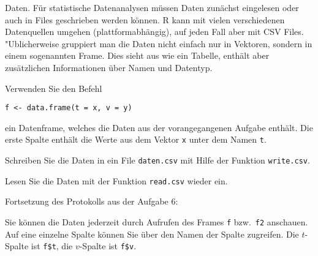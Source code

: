 Daten. Für statistische Datenanalysen müssen Daten zunächst eingelesen
oder auch in Files geschrieben werden können.
R kann mit vielen verschiedenen Datenquellen umgehen
(plattformabhängig), auf jeden Fall aber mit CSV Files.
"Ublicherweise gruppiert man die Daten nicht einfach nur in Vektoren, sondern
in einem sogenannten Frame. Dies sieht aus wie ein Tabelle, enthält aber
zusätzlichen Informationen über Namen und Datentyp.
\begin{teilaufgaben}
\item Verwenden Sie den Befehl
\begin{verbatim}
f <- data.frame(t = x, v = y)
\end{verbatim}
ein Datenframe, welches die Daten aus der vorangegangenen
Aufgabe enthält. Die erste Spalte enthält die Werte aus dem Vektor
{\tt x} unter dem Namen {\tt t}.
\item Schreiben Sie die Daten in ein File {\tt daten.csv} mit Hilfe der
Funktion {\tt write.csv}.
\item Lesen Sie die Daten mit der Funktion {\tt read.csv} wieder ein.
\end{teilaufgaben}

\begin{loesung}
Fortsetzung des Protokolls aus der Aufgabe 6:

Sie können die Daten jederzeit durch Aufrufen des Frames {\tt f}
bzw.~{\tt f2} anschauen. Auf eine einzelne Spalte können Sie über
den Namen der Spalte zugreifen. Die $t$-Spalte ist {\tt f\$t},
die $v$-Spalte ist {\tt f\$v}.
\end{loesung}

